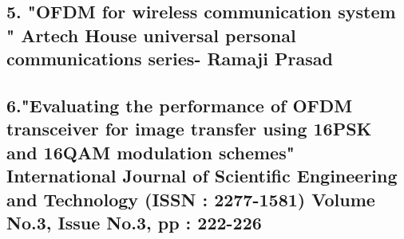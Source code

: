 \documentclass[12pt]{report}
\begin{document}
\subsection*{5. "OFDM for wireless communication system " Artech House universal personal communications series- Ramaji Prasad}
\subsection*{6."Evaluating the performance of OFDM transceiver for image transfer using
16PSK and 16QAM modulation schemes" International Journal of Scientific Engineering and Technology (ISSN : 2277-1581)
Volume No.3, Issue No.3, pp : 222-226}






    
    
    
\end{document}
